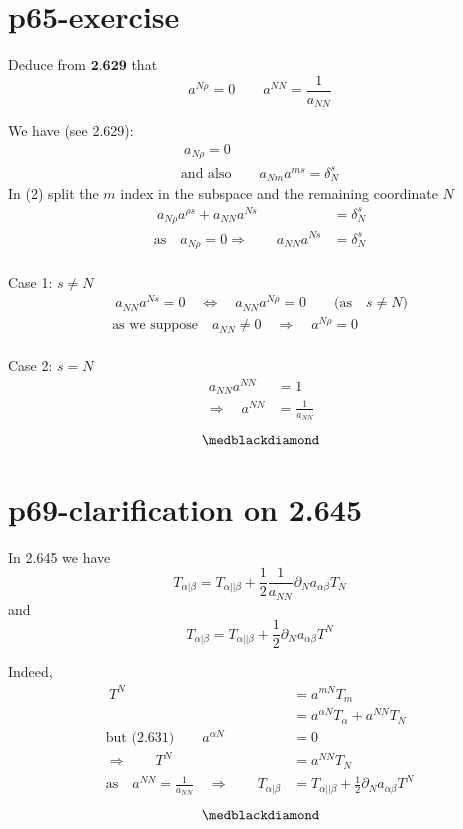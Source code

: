 \section{p65-exercise}
\begin{tcolorbox}
Deduce from $\textbf{2.629}$ that $$a^{N \rho} = 0  \quad\quad a^{NN} = \frac{1}{a_{NN}}$$
\end{tcolorbox}
We have (see 2.629):
\begin{align}
\ a_{N\rho} =0\\
\text{and also}\quad\quad a_{Nm}a^{ms} = \delta^s_N
\end{align}
In (2) split the $m$ index in the subspace and the remaining coordinate $N$
\begin{align}
\ a_{N\rho}a^{\rho s} +  a_{NN}a^{N s} &= \delta^s_N\\
\text{as}\quad a_{N\rho} =0 \Rightarrow \quad\quad a_{NN}a^{N s} &= \delta^s_N
\end{align}\\
Case 1: $s\ne N$
\begin{align}
\  a_{NN}a^{N s} =0 \quad \Leftrightarrow \quad a_{NN}a^{N \rho} =0 \quad\quad \text{(as}\quad s\ne N \text{)}\\
\text{as we suppose}\quad a_{NN}\ne 0 \quad \Rightarrow \quad a^{N \rho} =0
\end{align}\\

Case 2: $s= N$
\begin{align}
\  a_{NN}a^{N N} &=1 \\
\Rightarrow \quad a^{N N} &=\frac{1}{a_{NN}}
\end{align}
$$\medblackdiamond$$
\newpage


\section{p69-clarification on 2.645}
\begin{tcolorbox}
In 2.645 we have $$T_{\alpha | \beta} =T_{\alpha || \beta}  +\frac{1}{2}\frac{1}{a_{NN}}\partial_N  a_{\alpha\beta}T_{N}$$ and $$T_{\alpha | \beta} =T_{\alpha || \beta}  +\frac{1}{2}\partial_N  a_{\alpha\beta}T^{N}$$
\end{tcolorbox}
Indeed,
\begin{align}
\ T^N &= a^{mN}T_m\\
\ & = a^{\alpha N}T_{\alpha}+a^{N N}T_{N}\\
\text{but (2.631)}\quad\quad a^{\alpha N} &= 0\\
\Rightarrow \quad\quad T^N &= a^{NN} T_N\\
\text{as}\quad a^{NN}= \frac{1}{a_{NN}} \quad \Rightarrow \quad\quad  T_{\alpha | \beta} &= T_{\alpha || \beta}  + \frac{1}{2}\partial_N  a_{\alpha\beta}T^{N}
\end{align}
$$\medblackdiamond$$
\newpage

